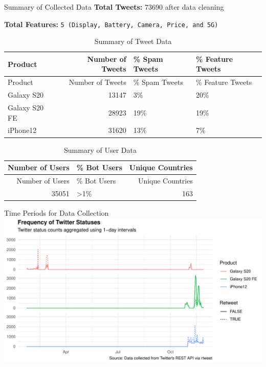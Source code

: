 \documentclass[
  ignorenonframetext,
]{beamer}
\begin{document}
\begin{frame}[fragile]{Summary of Collected Data}
\protect\hypertarget{summary-of-collected-data}{}
\textbf{Total Tweets:} 73690 after data cleaning

\textbf{Total Features:}
\texttt{5\ (Display,\ Battery,\ Camera,\ Price,\ and\ 5G)}

\begin{longtable}[]{@{}lrll@{}}
\caption{Summary of Tweet Data}\tabularnewline
\toprule
Product & Number of Tweets & \% Spam Tweets & \% Feature
Tweets\tabularnewline
\midrule
\endfirsthead
\toprule
Product & Number of Tweets & \% Spam Tweets & \% Feature
Tweets\tabularnewline
\midrule
\endhead
Galaxy S20 & 13147 & 3\% & 20\%\tabularnewline
Galaxy S20 FE & 28923 & 19\% & 19\%\tabularnewline
iPhone12 & 31620 & 13\% & 7\%\tabularnewline
\bottomrule
\end{longtable}

\begin{longtable}[]{@{}rlr@{}}
\caption{Summary of User Data}\tabularnewline
\toprule
Number of Users & \% Bot Users & Unique Countries\tabularnewline
\midrule
\endfirsthead
\toprule
Number of Users & \% Bot Users & Unique Countries\tabularnewline
\midrule
\endhead
35051 & \textgreater1\% & 163\tabularnewline
\bottomrule
\end{longtable}
\end{frame}

\begin{frame}{Time Periods for Data Collection}
\protect\hypertarget{time-periods-for-data-collection}{}
\includegraphics{SocialMedia_10570155_10696253_10701983_files/figure-beamer/unnamed-chunk-1-1.pdf}
\end{frame}
\end{document}

